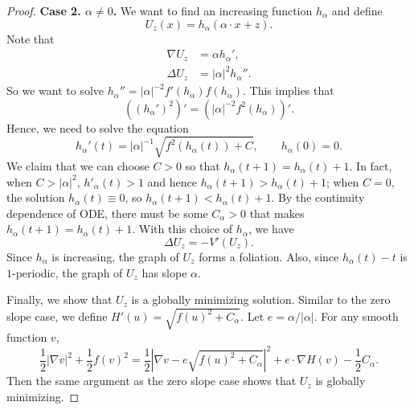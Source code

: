 \documentclass[10pt,a4paper]{amsart}
\begin{document}
\begin{proof}
			\medskip
			
			
			{\bf Case 2. $\alpha\neq 0$.} 
			We want to find an increasing function $h_\alpha$ and define 
			\begin{equation}
				U_{z}(x)=h_{\alpha}(\alpha\cdot x+z).
			\end{equation}
			Note that 
			\[
			\begin{split}
				\nabla U_z&=\alpha  h_\alpha',
				\\
				\Delta U_z&=|\alpha|^2 h_\alpha''.
			\end{split}
			\]
			So we want to solve $h_\alpha''=|\alpha|^{-2}f'(h_\alpha)f(h_\alpha)$. This implies that
			\[
			((h_\alpha')^2)'=(|\alpha|^{-2}f^2(h_\alpha))'.
			\]
			Hence, we need to solve the equation
			\begin{equation}
				h_{\alpha}'(t)=|\alpha|^{-1}\sqrt{f^2(h_\alpha(t))+C},\qquad h_\alpha(0)=0.
			\end{equation}
			We claim that we can choose $C>0$ so that $h_{\alpha}(t+1)=h_{\alpha}(t)+1$. In fact, when $C>|\alpha|^2$, $h'_\alpha(t)> 1$ and hence $h_{\alpha}(t+1)>h_{\alpha}(t)+1$; when $C=0$, the solution $h_{\alpha}(t)\equiv 0$, so $h_{\alpha}(t+1)<h_{\alpha}(t)+1$. By the continuity dependence of ODE, there must be some $C_\alpha>0$ that makes $h_{\alpha}(t+1)=h_{\alpha}(t)+1$. With this choice of $h_{\alpha}$, we have
			\begin{equation}
				\Delta U_z=-V'(U_z).
			\end{equation}
			Since $h_\alpha$ is increasing, the graph of $U_z$ forms a foliation. Also, since $h_{\alpha}(t)-t$ is $1$-periodic, the graph of $U_z$ has slope $\alpha$.
			
			Finally, we show that $U_z$ is a globally minimizing solution. Similar to the zero slope case, we define $H'(u)=\sqrt{f(u)^2+C_\alpha}$. Let $e=\alpha/|\alpha|$. For any smooth function $v$,
			\begin{equation}
				\frac{1}{2}|\nabla v|^2+\frac{1}{2}f(v)^2=\frac{1}{2}|\nabla v-e\sqrt{f(u)^2+C_\alpha}|^2+e\cdot \nabla H(v)-\frac{1}{2}C_\alpha.    
			\end{equation}
			Then the same argument as the zero slope case shows that $U_z$ is globally minimizing.
		\end{proof}
\end{document}

